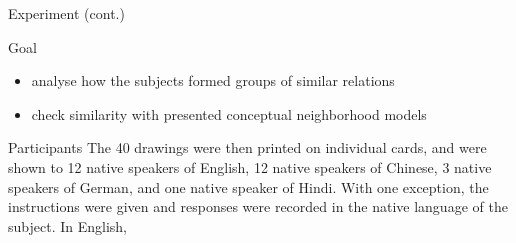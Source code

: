 \begin{frame}{Experiment (cont.)}
	\begin{block}{Goal}
		\begin{itemize}
			\item analyse how the subjects formed groups of similar relations
			\item check similarity with presented conceptual neighborhood models
		\end{itemize}
	\end{block}
\end{frame}
\begin{comment}
	- data obtained from an earlier human-subject study
	
\end{comment}

\begin{frame}{Participants}
	The 40 drawings were then printed on individual cards, and were shown to 12 native speakers of English, 12 native speakers of Chinese, 3 native speakers of German, and one native speaker of Hindi. With one exception, the instructions were given and responses were recorded in the native language of the subject. In English, 
\end{frame}

